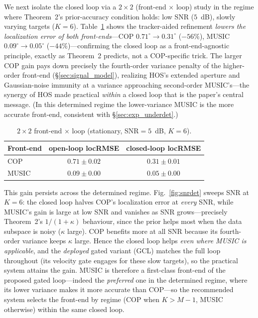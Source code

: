 \documentclass[journal]{IEEEtran}
\begin{document}
We next isolate the closed loop via a $2\times2$ (front-end $\times$ loop) study
in the regime where Theorem~2's prior-accuracy condition holds: low SNR ($5$~dB),
slowly varying targets ($K=6$). Table~\ref{tab:loop2x2}
shows the tracker-aided refinement \emph{lowers the localization error of both
front-ends}---COP $0.71^\circ\!\to\!0.31^\circ$ ($-56\%$), MUSIC
$0.09^\circ\!\to\!0.05^\circ$ ($-44\%$)---confirming the closed loop as a
front-end-agnostic principle, exactly as Theorem~2 predicts, not a COP-specific
trick. The larger COP gain pays down precisely the fourth-order variance penalty
of the higher-order front-end (\S\ref{sec:signal_model}), realizing HOS's extended
aperture and Gaussian-noise immunity at a variance approaching second-order
MUSIC's---the synergy of HOS made practical \emph{within} a closed loop that is the
paper's central message. (In this determined regime the lower-variance MUSIC is the
more accurate front-end, consistent with \S\ref{sec:exp_underdet}.)

\begin{table}[t]
\centering
\caption{$2\times2$ front-end $\times$ loop (stationary, SNR$=5$~dB, $K=6$).}
\label{tab:loop2x2}
\small
\begin{tabular}{@{}lcc@{}}
\toprule
Front-end & open-loop locRMSE & closed-loop locRMSE \\
\midrule
COP   & $0.71\pm0.02$ & $\mathbf{0.31\pm0.01}$ \\
MUSIC & $0.09\pm0.00$ & $\mathbf{0.05\pm0.00}$ \\
\bottomrule
\end{tabular}
\end{table}

This gain persists across the determined regime. Fig.~\ref{fig:snrdet} sweeps SNR
at $K=6$: the closed loop halves COP's localization error at \emph{every} SNR,
while MUSIC's gain is large at low SNR and vanishes as SNR grows---precisely
Theorem~2's $1/(1{+}\kappa)$ behaviour, since the prior helps most when the data
subspace is noisy ($\kappa$ large). COP benefits more at all SNR because its
fourth-order variance keeps $\kappa$ large. Hence the closed loop helps \emph{even
where MUSIC is applicable}, and the \emph{deployed} gated variant (GCL) matches the
full loop throughout (its velocity gate engages for these slow targets), so the
practical system attains the gain. MUSIC is therefore a first-class front-end of
the proposed gated loop---indeed the \emph{preferred} one in the determined regime,
where its lower variance makes it more accurate than COP---so the recommended
system selects the front-end by regime (COP when $K>M{-}1$, MUSIC otherwise) within
the same closed loop.
\end{document}
